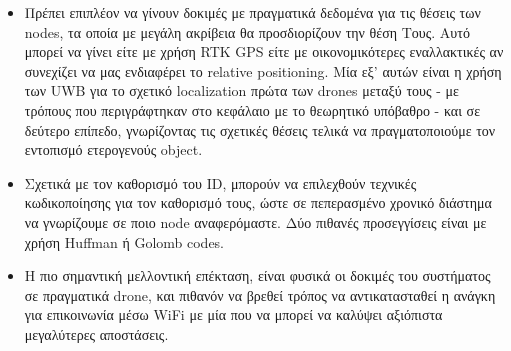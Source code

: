 \begin{itemize}
    \item Πρέπει επιπλέον να γίνουν δοκιμές με πραγματικά δεδομένα για τις θέσεις των nodes, τα οποία με μεγάλη ακρίβεια θα προσδιορίζουν την θέση Τους. Αυτό μπορεί να γίνει είτε με χρήση RTK GPS είτε με οικονομικότερες εναλλακτικές αν συνεχίζει να μας ενδιαφέρει το relative positioning. Μία εξ' αυτών είναι η χρήση των UWB για το σχετικό localization πρώτα των drones μεταξύ τους - με τρόπους που περιγράφτηκαν στο κεφάλαιο με το θεωρητικό υπόβαθρο - και σε δεύτερο επίπεδο, γνωρίζοντας τις σχετικές θέσεις τελικά να πρα\-γμα\-το\-ποιού\-με τον εντοπισμό ετερογενούς object. 
    \item Σχετικά με τον καθορισμό του ID, μπορούν να επιλεχθούν τεχνικές κω\-δι\-κο\-ποί\-η\-σης για τον καθορισμό τους, ώστε σε πεπερασμένο χρονικό διάστημα να γνωρίζουμε σε ποιο node αναφερόμαστε. Δύο πιθανές προσεγγίσεις είναι με χρήση Huffman ή Golomb codes.
    \item Η πιο σημαντική μελλοντική επέκταση, είναι φυσικά οι δοκιμές του συστήματος σε πραγματικά drone, και πιθανόν να βρεθεί τρόπος να αντικατασταθεί η ανάγκη για επικοινωνία μέσω WiFi με μία που να μπορεί να καλύψει αξιόπιστα μεγαλύτερες αποστάσεις.
  \end{itemize}



